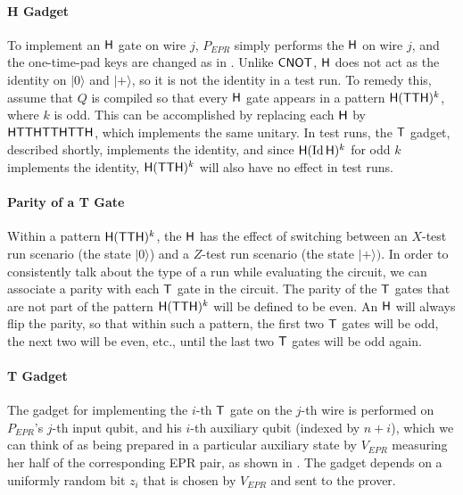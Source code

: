 \documentclass{toc}
\newcommand{\ket}[1]{|#1\rangle}
\newcommand{\Id}{\ensuremath{\mathop{\rm Id}\nolimits}}
\begin{document}
\paragraph{H Gadget} To implement an $\sf H$ gate on wire $j$, $P_{EPR}$ simply performs the $\sf H$ on wire $j$, and the one-time-pad keys are changed as in . Unlike $\sf CNOT$, $\sf H$ does not act as the identity on $\ket{0}$ and $\ket{+}$, so it is not the identity in a test run. To remedy this, assume that $Q$ is compiled so that every $\sf H$ gate appears in a pattern ${\sf H}({\sf TTH})^k$, where $k$ is odd. This can be accomplished by replacing each $\sf H$ by $\sf HTTHTTHTTH$, which implements the same unitary. In test runs, the $\sf T$ gadget, described shortly, implements the identity, and since ${\sf H}(\Id {\sf H})^k$ for odd $k$ implements the identity, ${\sf H}({\sf TTH})^k$ will also have no effect in test runs. 

\paragraph{Parity of a T Gate} Within a pattern ${\sf H}({\sf TTH})^k$, the $\sf H$ has the effect of switching between an $X$-test run scenario (the state $\ket{0}$) and a $Z$-test run scenario (the state $\ket{+})$. In order to consistently talk about the type of a run while evaluating the circuit, we can associate a parity with each $\sf T$ gate in the circuit. The parity of the $\sf T$ gates that are not part of the pattern ${\sf H}({\sf TTH})^k$ will be defined to be even. An ${\sf H}$ will always flip the parity, so that within such a pattern, the first two ${\sf T}$ gates will be odd, the next two will be even, etc., until the last two $\sf T$ gates will be odd again. 

\paragraph{T Gadget} The gadget for implementing the $i$-th $\sf T$ gate on the $j$-th wire is performed on $P_{EPR}$'s $j$-th input qubit, and his $i$-th auxiliary qubit (indexed by $n+i$), which we can think of as being prepared in a particular auxiliary state by $V_{EPR}$ measuring her half of the corresponding EPR pair, as shown in . The gadget depends on a uniformly random bit $z_i$ that is chosen by $V_{EPR}$ and sent to the prover. 
\end{document}
